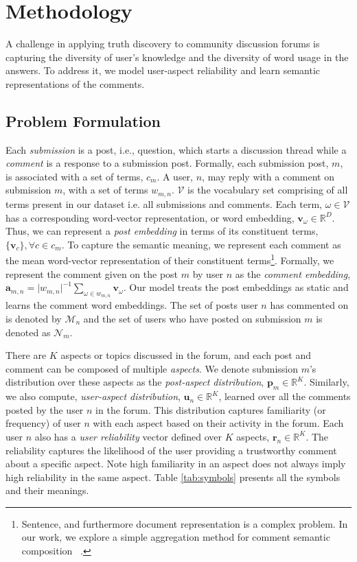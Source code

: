 \section{Methodology} \label{sec:model}
A challenge in applying truth discovery to community discussion forums is capturing the diversity of user's knowledge and the diversity of word usage in the answers. To address it, we model user-aspect reliability and learn semantic representations of the comments.
\subsection{Problem Formulation}
Each \textit{submission} is a post, i.e., question, which starts a discussion thread while a \textit{comment} is a response to a submission post.
Formally, each submission post, $m$, is associated with a set of terms, $c_m$. A user, $n$, may reply with a comment on submission $m$, with a set of terms $w_{m, n}$. $\mathcal{V}$ is the vocabulary set comprising of all terms present in our dataset i.e. all submissions and comments. Each term, $\omega \in \mathcal{V} $ has a corresponding word-vector representation, or word embedding, $\bm{v}_\omega \in \mathbb{R}^D$. Thus, we can represent a \emph{post embedding} in terms of its constituent terms, $ \{ \bm{v}_c \}, \forall c \in c_m $. To capture the semantic meaning, we represent each comment as the mean word-vector representation of their constituent terms\footnote{Sentence, and furthermore document representation is a complex problem. In our work, we explore a simple aggregation method for comment semantic composition ~\cite{wang2016sentence}.}. Formally,
we represent the comment given on the post $m$ by user $n$ as the \emph{comment embedding}, $\bm{a}_{m,n} = {\vert w_{m, n} \vert}^{-1} \sum_{\omega \in w_{m,n}} \bm{v}_{\omega}$. Our model treats the post embeddings as static and learns the comment word embeddings. The set of posts user $n$ has commented on is denoted by $\mathcal{M}_n$ and the set of users who have posted on submission $m$ is denoted as $\mathcal{N}_m$.

There are $K$ aspects or topics discussed in the forum, and each post and comment can be composed of multiple \emph{aspects}. We denote submission $m$'s distribution over these aspects as the \emph{post-aspect distribution}, $\bm{p}_m \in \mathbb{R}^K$.
Similarly, we also compute, \emph{user-aspect distribution}, $\bm{u}_n \in \mathbb{R}^K$, learned over all the comments posted by the user $n$ in the forum. This distribution captures familiarity (or frequency) of user $n$ with each aspect based on their activity in the forum. Each user $n$ also has a \emph{user reliability} vector defined over $K$ aspects, $\bm{r}_n \in \mathbb{R}^K$.
The reliability captures the likelihood of the user providing a trustworthy comment
about a specific aspect. Note high familiarity in an aspect does not always imply high reliability in the same aspect. Table \ref{tab:symbols} presents all the symbols and their meanings.

